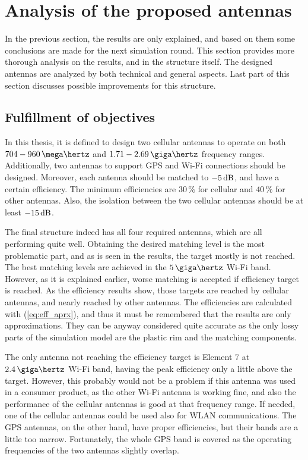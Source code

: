 \section{Analysis of the proposed antennas}
\label{sec:analysis}
In the previous section, the results are only explained, and based on them some conclusions are made for the next simulation round. This section provides more thorough analysis on the results, and in the structure itself. The designed antennas are analyzed by both technical and general aspects. Last part of this section discusses possible improvements for this structure.

\vspace{-7pt}
\subsection{Fulfillment of objectives}
\label{sec:fulfillment}
\vspace{-3pt}
In this thesis, it is defined to design two cellular antennas to operate on both $704-960\,\mega\hertz$ and $1.71-2.69\,\giga\hertz$ frequency ranges. Additionally, two antennas to support GPS and Wi-Fi connections should be designed. Moreover, each antenna should be matched to $-5\,\mathrm{dB}$, and have a certain efficiency. The minimum efficiencies are $30\,\%$ for cellular and $40\,\%$ for other antennas. Also, the isolation between the two cellular antennas should be at least $-15\,\mathrm{dB}$.

The final structure indeed has all four required antennas, which are all performing quite well. Obtaining the desired matching level is the most problematic part, and as is seen in the results, the target mostly is not reached. The best matching levels are achieved in the $5\,\giga\hertz$ Wi-Fi band. However, as it is explained earlier, worse matching is accepted if efficiency target is reached. As the efficiency results show, those targets are reached by cellular antennas, and nearly reached by other antennas. The efficiencies are calculated with (\ref{eq:eff_aprx}), and thus it must be remembered that the results are only approximations. They can be anyway considered quite accurate as the only lossy parts of the simulation model are the plastic rim and the matching components. 

The only antenna not reaching the efficiency target is Element 7 at $2.4\,\giga\hertz$ Wi-Fi band, having the peak efficiency only a little above the target. However, this probably would not be a problem if this antenna was used in a consumer product, as the other Wi-Fi antenna is working fine, and also the performance of the cellular antennas is good at that frequency range. If needed, one of the cellular antennas could be used also for WLAN communications. The GPS antennas, on the other hand, have proper efficiencies, but their bands are a little too narrow. Fortunately, the whole GPS band is covered as the operating frequencies of the two antennas slightly overlap.

